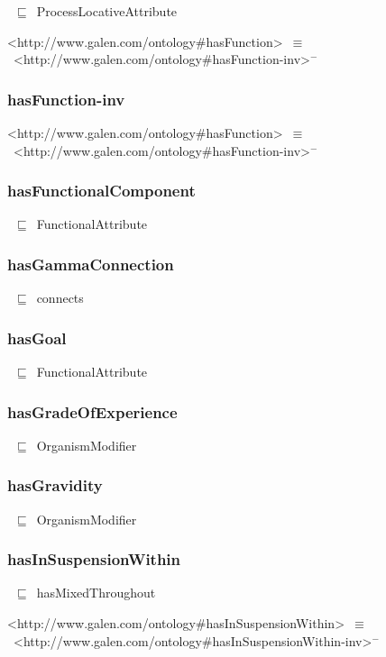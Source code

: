 \documentclass{article}
\begin{document}
~\ensuremath{\sqsubseteq}~ProcessLocativeAttribute

<http://www.galen.com/ontology#hasFunction>~\ensuremath{\equiv}~<http://www.galen.com/ontology#hasFunction-inv>\ensuremath{^-}

\subsubsection*{hasFunction-inv}

<http://www.galen.com/ontology#hasFunction>~\ensuremath{\equiv}~<http://www.galen.com/ontology#hasFunction-inv>\ensuremath{^-}

\subsubsection*{hasFunctionalComponent}

~\ensuremath{\sqsubseteq}~FunctionalAttribute

\subsubsection*{hasGammaConnection}

~\ensuremath{\sqsubseteq}~connects

\subsubsection*{hasGoal}

~\ensuremath{\sqsubseteq}~FunctionalAttribute

\subsubsection*{hasGradeOfExperience}

~\ensuremath{\sqsubseteq}~OrganismModifier

\subsubsection*{hasGravidity}

~\ensuremath{\sqsubseteq}~OrganismModifier

\subsubsection*{hasInSuspensionWithin}

~\ensuremath{\sqsubseteq}~hasMixedThroughout

<http://www.galen.com/ontology#hasInSuspensionWithin>~\ensuremath{\equiv}~<http://www.galen.com/ontology#hasInSuspensionWithin-inv>\ensuremath{^-}
\end{document}
